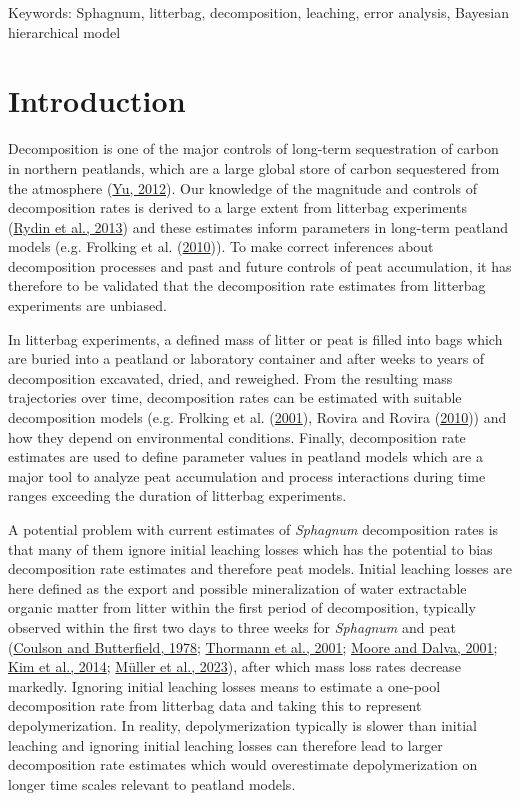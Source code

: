 \documentclass[
  12pt,
]{article}
\begin{document}
Keywords: Sphagnum, litterbag, decomposition, leaching, error analysis, Bayesian hierarchical model

\hypertarget{introduction}{%
\section{Introduction}\label{introduction}}

Decomposition is one of the major controls of long-term sequestration of carbon in northern peatlands, which are a large global store of carbon sequestered from the atmosphere (\protect\hyperlink{ref-Yu.2012}{Yu, 2012}). Our knowledge of the magnitude and controls of decomposition rates is derived to a large extent from litterbag experiments (\protect\hyperlink{ref-Rydin.2013}{Rydin et al., 2013}) and these estimates inform parameters in long-term peatland models (e.g. Frolking et al. (\protect\hyperlink{ref-Frolking.2010}{2010})). To make correct inferences about decomposition processes and past and future controls of peat accumulation, it has therefore to be validated that the decomposition rate estimates from litterbag experiments are unbiased.

In litterbag experiments, a defined mass of litter or peat is filled into bags which are buried into a peatland or laboratory container and after weeks to years of decomposition excavated, dried, and reweighed. From the resulting mass trajectories over time, decomposition rates can be estimated with suitable decomposition models (e.g. Frolking et al. (\protect\hyperlink{ref-Frolking.2001}{2001}), Rovira and Rovira (\protect\hyperlink{ref-Rovira.2010}{2010})) and how they depend on environmental conditions. Finally, decomposition rate estimates are used to define parameter values in peatland models which are a major tool to analyze peat accumulation and process interactions during time ranges exceeding the duration of litterbag experiments.

A potential problem with current estimates of \emph{Sphagnum} decomposition rates is that many of them ignore initial leaching losses which has the potential to bias decomposition rate estimates and therefore peat models. Initial leaching losses are here defined as the export and possible mineralization of water extractable organic matter from litter within the first period of decomposition, typically observed within the first two days to three weeks for \emph{Sphagnum} and peat (\protect\hyperlink{ref-Coulson.1978}{Coulson and Butterfield, 1978}; \protect\hyperlink{ref-Thormann.2001}{Thormann et al., 2001}; \protect\hyperlink{ref-Moore.2001}{Moore and Dalva, 2001}; \protect\hyperlink{ref-Kim.2014}{Kim et al., 2014}; \protect\hyperlink{ref-Muller.2023}{Müller et al., 2023}), after which mass loss rates decrease markedly. Ignoring initial leaching losses means to estimate a one-pool decomposition rate from litterbag data and taking this to represent depolymerization. In reality, depolymerization typically is slower than initial leaching and ignoring initial leaching losses can therefore lead to larger decomposition rate estimates which would overestimate depolymerization on longer time scales relevant to peatland models.
\end{document}
